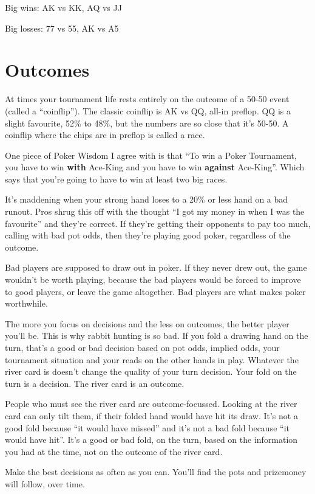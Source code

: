 Big wins: AK vs KK, AQ vs JJ 

Big losses: 77 vs 55, AK vs A5

\section{Outcomes}

At times your tournament life rests entirely on the outcome of
a 50-50 event (called a ``coinflip'').
The classic coinflip is AK vs QQ, all-in preflop. QQ is a slight
favourite, 52\% to 48\%, but the numbers are so close that it's 50-50.
A coinflip where the chips are in preflop is called a race.

One piece of Poker Wisdom I agree with is that ``To win a
Poker Tournament, you have to win \textbf{with} Ace-King and
you have to win \textbf{against} Ace-King''. Which says that you're
going to have to win at least two big races.

It's maddening when your strong hand loses to a 20\% or less
hand on a bad runout. Pros shrug this off with
the thought ``I got my money in when I was the favourite'' and they're
correct. If they're getting their opponents to pay too much, calling
with bad pot odds, then they're playing good poker, regardless of
the outcome.

Bad players are supposed to draw out in poker. If they never drew
out, the game wouldn't be worth playing, because the bad players
would be forced to improve to good players, or leave the game
altogether. Bad players are what makes poker worthwhile.


The more you focus on decisions and the less on outcomes, the
better player you'll be. This is why rabbit hunting is so bad. If
you fold a drawing hand on the turn, that's a good or bad decision
based on pot odds, implied odds, your tournament situation
and your reads on the other hands in play. Whatever the river card is
doesn't change the quality of your turn decision. Your fold on the
turn is a decision. The river card is an outcome.

People who must see the river card are outcome-focussed. Looking
at the river card can only tilt them, if their folded hand would
have hit its draw. It's not a good fold because ``it would have
missed'' and it's not a bad fold because ``it would have hit''. It's
a good or bad fold, on the turn, based on the information you
had at the time, not on the outcome of the river card.


Make the best decisions as often as you can. You'll find the pots
and prizemoney will follow, over time.
